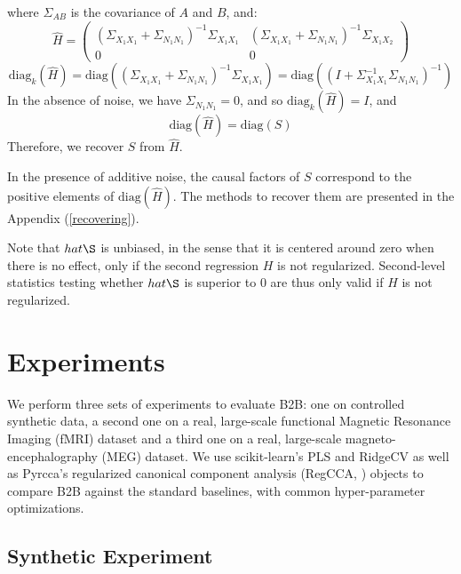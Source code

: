 \documentclass[preprint,12pt,3p]{elsarticle}
\begin{document}
where $\Sigma_{A B}$ is the covariance of $A$ and $B$, and:
\begin{equation}
  \hat H = \left(\begin{array}{cc}(\Sigma_{X_1 X_1}+\Sigma_{N_1 N_1})^{-1}\Sigma_{X_1 X_1} & (\Sigma_{X_1 X_1}+\Sigma_{N_1 N_1})^{-1}\Sigma_{X_1 X_2} \\0 & 0\end{array}\right)
\end{equation}
\begin{equation}
  \text{diag}_k (\hat H) = \text{diag}((\Sigma_{X_1 X_1}+\Sigma_{N_1 N_1})^{-1}\Sigma_{X_1 X_1}) = \text{diag}((I+\Sigma_{X_1 X_1}^{-1}\Sigma_{N_1 N_1})^{-1})
  \label{eq:diagk}
\end{equation}
%
%
In the absence of noise, we have $\Sigma_{N_1 N_1}=0$, and so
$\text{diag}_k(\hat H)=I$, and $$\text{diag}(\hat H) = \text{diag}(S)$$
Therefore, we recover $S$ from $\hat H$.


In the presence of additive noise, the causal factors of $S$ correspond to the positive
elements of $\text{diag}(\hat H)$. The methods to recover them are presented in
the Appendix (\ref{recovering}).

Note that $hat \S $ is unbiased, in the sense that it is centered around zero when there is no
effect, only if the second regression $H$ is not regularized. Second-level
statistics testing whether $hat \S$ is superior to 0 are thus only valid if $H$
is not regularized.

\section{Experiments}

We perform three sets of experiments to evaluate B2B: one on controlled synthetic
data, a second one on a real, large-scale functional Magnetic Resonance Imaging
(fMRI) dataset and a third one on a real, large-scale magneto-encephalography (MEG)
dataset.
%
We use scikit-learn's PLS and RidgeCV \citep{sklearn} as well as Pyrcca's
regularized canonical component analysis (RegCCA, \citep{bilenko2016Pyrcca})
objects to compare B2B against the standard baselines, with common
hyper-parameter optimizations.

\subsection{Synthetic Experiment}
\label{sec:experiment_synthetic}

\end{document}
